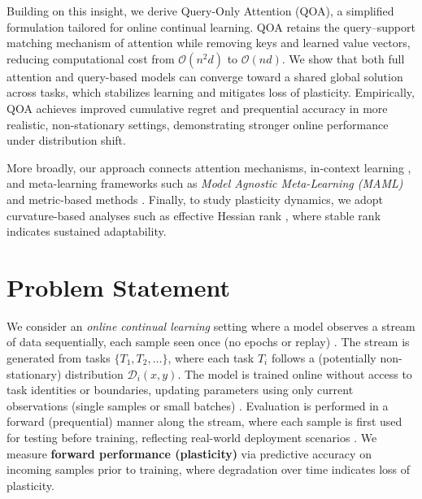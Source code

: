 \documentclass{article}
\begin{document}
Building on this insight, we derive Query-Only Attention (QOA), a simplified formulation tailored for online continual learning. QOA retains the query--support matching mechanism of attention while removing keys and learned value vectors, reducing computational cost from $\mathcal{O}(n^2 d)$ to $\mathcal{O}(n d)$. We show that both full attention and query-based models can converge toward a shared global solution across tasks, which stabilizes learning and mitigates loss of plasticity. Empirically, QOA achieves improved cumulative regret and prequential accuracy in more realistic, non-stationary settings, demonstrating stronger online performance under distribution shift.

More broadly, our approach connects attention mechanisms, in-context learning \citep{dong2024survey, wu2025why, ahn2023transformers}, and meta-learning frameworks such as \emph{Model Agnostic Meta-Learning (MAML)} \citep{finn2017maml} and metric-based methods \citep{vinyals2016matching, koch2015siamese, snell2017prototypical}. Finally, to study plasticity dynamics, we adopt curvature-based analyses such as effective Hessian rank \citep{lewandowski2023curvature, roy2007effective}, where stable rank indicates sustained adaptability.



\section{Problem Statement}
We consider an \textit{online continual learning} setting where a model observes a stream of data sequentially, each sample seen once (no epochs or replay) \citep{cai2021online, aljundi2019online}. The stream is generated from tasks $\{T_1, T_2, \dots\}$, where each task $T_i$ follows a (potentially non-stationary) distribution $\mathcal{D}_i(x,y)$. 
The model is trained online without access to task identities or boundaries, updating parameters using only current observations (single samples or small batches) \citep{koh2021online, chaudhry2018riemannian, aljundi2019online}. 
Evaluation is performed in a forward (prequential) manner along the stream, where each sample is first used for testing before training, reflecting real-world deployment scenarios \citep{dawid1984present, gama2013survey, cai2021online, lin2022clear}. 
We measure \textbf{forward performance (plasticity)} via predictive accuracy on incoming samples prior to training, where degradation over time indicates loss of plasticity.
\end{document}
